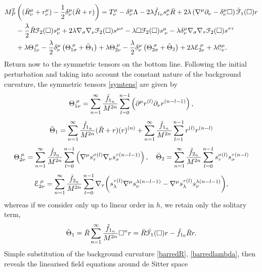 \[
\begin{aligned}
M_{P}^{2}&\left((\bar{R}_{\nu}^{\mu}+r_{\nu}^{\mu})-\frac{1}{2}\delta_{\nu}^{\mu}(\bar{R}+r)\right)  =T_{\nu}^{\mu}-\delta_{\nu}^{\mu}\Lambda-2\lambda\tilde{f}_{1_{0}}s_{\nu}^{\mu}\bar{R}+2\lambda\left(\nabla^{\mu}\partial_{\nu}-\delta_{\nu}^{\mu}\square\right)\tilde{{\cal F}}_{1}(\Box)r\\
 & -\frac{\lambda}{2}\bar{R}{\cal F}_{2}(\Box)s_{\nu}^{\mu}+2\lambda\nabla_{\sigma}\nabla_{\nu}{\cal F}_{2}(\Box)s^{\mu\sigma}-\lambda\square{\cal F}_{2}(\Box)s_{\;\nu}^{\mu}-\lambda\delta_{\nu}^{\mu}\nabla_{\sigma}\nabla_{\tau}{\cal F}_{2}(\Box)s^{\sigma\tau}\\
 & +\lambda\Theta_{1\nu}^{\;\mu}-\frac{\lambda}{2}\delta_{\nu}^{\mu}\left(\Theta_{1\sigma}^{\;\sigma}+\bar{\Theta}_{1}\right)+\lambda\Theta_{2\nu}^{\;\mu}-\frac{\lambda}{2}\delta_{\nu}^{\mu}\left(\Theta_{2\sigma}^{\;\sigma}+\bar{\Theta}_{2}\right)+2\lambda{\cal E}_{2\nu}^{\;\mu}+\lambda{\cal C}_{\nu}^{\mu}.
\end{aligned}
\]
Return now to the symmetric tensors on the bottom line. Following the initial perturbation and taking into account the constant nature of the background curvature, the symmetric tensors \eqref{symtens} are given by
\[
\nonumber
\Theta_{1\nu}^{\;\mu}=\sum_{n=1}^{\infty}\frac{\tilde{f}_{1_{n}}}{M^{2n}}\sum_{l=0}^{n-1}\left(\partial^{\mu}r^{(l)}\partial_{\nu}r^{(n-l-1)}\right),\]\[
\nonumber\bar{\Theta}_{1}=\sum_{n=1}^{\infty}\frac{\tilde{f}_{1_{n}}}{M^{2n}}(\bar{R}+r)(r)^{(n)}+\sum_{n=1}^{\infty}\frac{\tilde{f}_{1_{n}}}{M^{2n}}\sum_{l=1}^{n-1}r^{(l)}r^{(n-l)}
\]
\[
\Theta_{2\nu}^{\;\mu}=\sum_{n=1}^{\infty}\frac{\tilde{f}_{2_{n}}}{M^{2n}}\sum_{l=0}^{n-1}\left(\nabla^{\mu}s_{\tau}^{\sigma(l)}\nabla_{\nu}s_{\sigma}^{\tau(n-l-1)}\right),\quad\bar{\Theta}_{2}=\sum_{n=1}^{\infty}\frac{\tilde{f}_{2_{n}}}{M^{2n}}\sum_{l=0}^{n-1}s_{\tau}^{\sigma(l)}s_{\sigma}^{\tau(n-l)}
\nonumber\]
\[
{\cal E}_{2\nu}^{\;\mu}=\sum_{n=1}^{\infty}\frac{\tilde{f}_{2_{n}}}{M^{2n}}\sum_{l=0}^{n-1}\nabla_{\tau}\biggl(s_{\lambda}^{\tau(l)}\nabla^{\mu}s_{\nu}^{\lambda(n-l-1)}-\nabla^{\mu}s_{\lambda}^{\tau(l)}s_{\nu}^{\lambda(n-l-1)}\biggr),
\]
whereas if we consider only up to linear order in $h$, we retain only the solitary term,
\[
\bar{\Theta}_{1}=\bar{R}\sum_{n=1}^{\infty}\frac{\tilde{f}_{1_{n}}}{M^{2n}}\Box^n r=\bar{R}\tilde{{\cal F}_{1}}(\Box)r-\tilde{f}_{1_{0}}\bar{R}r
.\]
Simple substitution of the  background curvature \eqref{barredR}, \eqref{barredlambda}, then reveals the linearised field equations around de Sitter space
